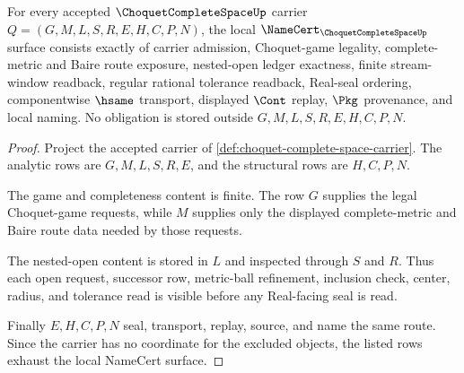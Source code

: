 \begin{theorem}
\label{thm:choquet-complete-space-namecert-obligations}
For every accepted $\ChoquetCompleteSpaceUp$ carrier $Q=(G,M,L,S,R,E,H,C,P,N)$, the local $\NameCert_{\ChoquetCompleteSpaceUp}$ surface consists exactly of carrier admission, Choquet-game legality, complete-metric and Baire route exposure, nested-open ledger exactness, finite stream-window readback, regular rational tolerance readback, Real-seal ordering, componentwise $\hsame$ transport, displayed $\Cont$ replay, $\Pkg$ provenance, and local naming. No obligation is stored outside $G,M,L,S,R,E,H,C,P,N$.
\end{theorem}
\begin{proof}
Project the accepted carrier of \autoref{def:choquet-complete-space-carrier}. The analytic rows are $G,M,L,S,R,E$, and the structural rows are $H,C,P,N$.

The game and completeness content is finite. The row $G$ supplies the legal Choquet-game requests, while $M$ supplies only the displayed complete-metric and Baire route data needed by those requests.

The nested-open content is stored in $L$ and inspected through $S$ and $R$. Thus each open request, successor row, metric-ball refinement, inclusion check, center, radius, and tolerance read is visible before any Real-facing seal is read.

Finally $E,H,C,P,N$ seal, transport, replay, source, and name the same route. Since the carrier has no coordinate for the excluded objects, the listed rows exhaust the local NameCert surface.
\end{proof}

